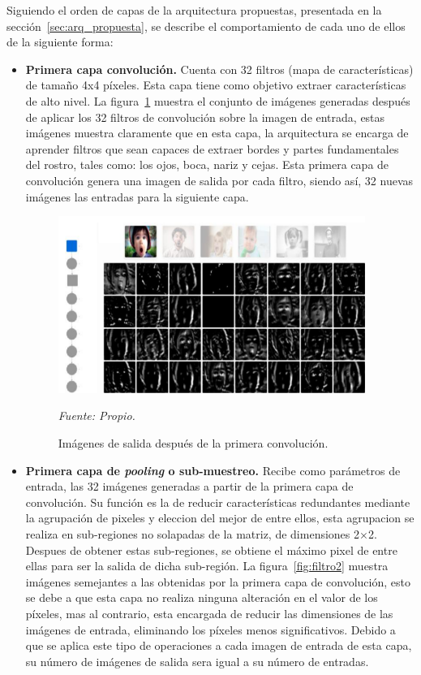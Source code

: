 Siguiendo el orden de capas de la arquitectura propuestas, presentada en la sección~\ref{sec:arq_propuesta}, se describe el comportamiento de cada uno de ellos de la siguiente forma: 
\begin{itemize}
\item
{
\textbf{Primera capa convolución.} Cuenta con 32 filtros (mapa de características) de tamaño 4x4 píxeles. Esta capa tiene como objetivo extraer características de alto nivel. La figura~\ref{fig:filtro1} muestra el conjunto de imágenes generadas después de aplicar los 32 filtros de convolución sobre la imagen de entrada, estas imágenes muestra claramente que en esta capa, la arquitectura se encarga de aprender filtros que sean capaces de extraer bordes y partes fundamentales del rostro, tales como: los ojos, boca, nariz y cejas. Esta primera capa de convolución genera una imagen de salida por cada filtro, siendo así, 32 nuevas imágenes las entradas para la siguiente capa. 

\begin{figure}[H]
		\centering
		\includegraphics[width=100mm]{Imagenes/filtro1.png}
		\caption{Imágenes de salida después de la primera convolución.}
		\vspace{0.15cm}
		\textit{Fuente: Propio.}
		\label{fig:filtro1}
\end{figure}
}

\item
{
\textbf{Primera capa de \textit{pooling} o sub-muestreo.} Recibe como parámetros de entrada, las 32 imágenes generadas a partir de la primera capa de convolución. Su función es la de reducir características redundantes mediante la agrupación de pixeles y eleccion del mejor de entre ellos, esta agrupacion se realiza en sub-regiones no solapadas de la matriz, de dimensiones 2$\times$2. Despues de obtener estas sub-regiones, se obtiene el máximo pixel de entre ellas para ser la salida de dicha sub-región. La figura~\ref{fig:filtro2} muestra imágenes semejantes a las obtenidas por la primera capa de convolución, esto se debe a que esta capa no realiza ninguna alteración en el valor de los píxeles, mas al contrario, esta encargada de reducir las dimensiones de las imágenes de entrada, eliminando los píxeles menos significativos. Debido a que se aplica este tipo de operaciones a cada imagen de entrada de esta capa, su número de imágenes de salida sera igual a su número de entradas.

}
\end{itemize}
